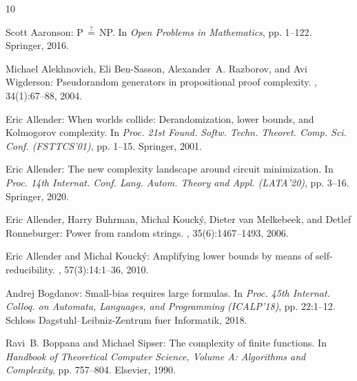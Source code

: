 \documentclass[11pt]{article}
\numberwithin{equation}{section}
\theoremstyle{definition}
\theoremstyle{plain}
\begin{document}
\tocrefpdfbookmark
\begin{thebibliography}{10}

{\sc Scott Aaronson}: {P$\,\stackrel{?}{=}\,$NP}.
\newblock In {\em Open Problems in Mathematics}, pp. 1--122. Springer, 2016.

{\sc Michael Alekhnovich, Eli Ben-Sasson, Alexander~A. Razborov, and Avi
  Wigderson}: Pseudorandom generators in propositional proof complexity.
, 34(1):67--88, 2004.

{\sc Eric Allender}: When worlds collide: Derandomization, lower bounds, and
  {K}olmogorov complexity.
\newblock In {\em Proc. 21st Found. Softw. Techn. Theoret. Comp. Sci. Conf.
  (FSTTCS'01)}, pp. 1--15. Springer, 2001.
\newblock [\epfmtdoi{10.1007/3-540-45294-X\_1}]

{\sc Eric Allender}: The new complexity landscape around circuit minimization.
\newblock In {\em Proc. 14th Internat. Conf. Lang. Autom. Theory and Appl.
  (LATA'20)}, pp. 3--16. Springer, 2020.

{\sc Eric Allender, Harry Buhrman, Michal Kouck{\'{y}}, Dieter van Melkebeek,
  and Detlef Ronneburger}: Power from random strings.
, 35(6):1467--1493, 2006.
\newblock [\epfmtdoi{10.1137/050628994}]

{\sc Eric Allender and Michal Kouck{\'{y}}}: Amplifying lower bounds by means
  of self-reducibility.
, 57(3):14:1--36, 2010.
\newblock [\epfmtdoi{10.1145/1706591.1706594}]

{\sc Andrej Bogdanov}: Small-bias requires large formulas.
\newblock In {\em Proc. 45th Internat. Colloq. on Automata, Languages, and
  Programming (ICALP'18)}, pp. 22:1--12. Schloss Dagstuhl--Leibniz-Zentrum fuer
  Informatik, 2018.

{\sc Ravi~B. Boppana and Michael Sipser}: The complexity of finite functions.
\newblock In {\em Handbook of Theoretical Computer Science, Volume {A:}
  {A}lgorithms and Complexity}, pp. 757--804. Elsevier, 1990.
\newblock [\epfmtdoi{10.1016/B978-0-444-88071-0.50019-9}]


\end{thebibliography}
\end{document}
